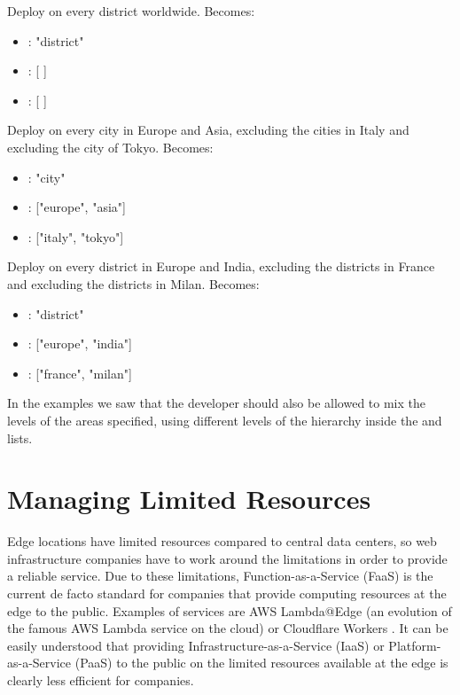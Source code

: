 \begin{example}
Deploy on every district worldwide.
Becomes:
\begin{itemize}
    \item {}: "district"
    \item {}: [ ]
    \item {}: [ ]
\end{itemize}
\end{example}

\begin{example}
Deploy on every city in Europe and Asia, excluding the cities in Italy and excluding the city of Tokyo.
Becomes:
\begin{itemize}
    \item {}: "city"
    \item {}: ["europe", "asia"]
     \item {}: ["italy", "tokyo"]
\end{itemize}
\end{example}

\begin{example}
Deploy on every district in Europe and India, excluding the districts in France and excluding the districts in Milan.
Becomes:
\begin{itemize}
    \item {}: "district"
    \item {}: ["europe", "india"]
     \item {}: ["france", "milan"]
\end{itemize}
\end{example}

In the examples we saw that the developer should also be allowed to mix the levels of the areas specified, using different levels of the hierarchy inside the  and  lists.


\section{Managing Limited Resources}
Edge locations have limited resources compared to central data centers, so web infrastructure companies have to work around the limitations in order to provide a reliable service.
Due to these limitations, Function-as-a-Service (FaaS) is the current de facto standard for companies that provide computing resources at the edge to the public. Examples of services are AWS Lambda@Edge (an evolution of the famous AWS Lambda service on the cloud) \cite{aws-lambda-at-edge} or Cloudflare Workers \cite{cloudflare-workers}. It can be easily understood that providing Infrastructure-as-a-Service (IaaS) or Platform-as-a-Service (PaaS) to the public on the limited resources available at the edge is clearly less efficient for companies.

